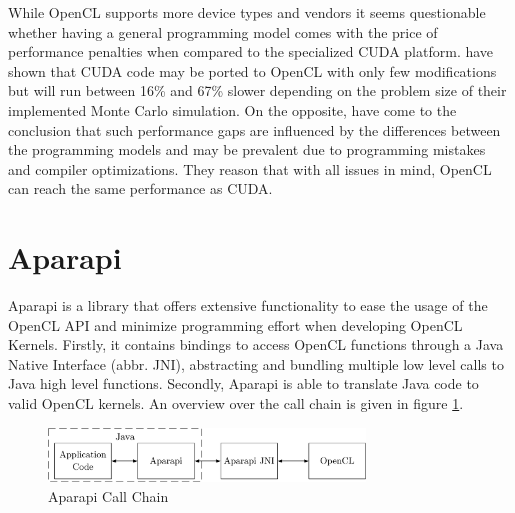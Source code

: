 While OpenCL supports more device types and vendors it seems questionable whether having a general programming model comes with the price of performance penalties when compared to the specialized CUDA platform. \citeauthor{performance_comparison} have shown that CUDA code may be ported to OpenCL with only few modifications but will run between 16\% and 67\% slower depending on the problem size of their implemented Monte Carlo simulation\cite{performance_comparison}. On the opposite, \citeauthor{comprehensive_performance_comparison} have come to the conclusion that such performance gaps are influenced by the differences between the programming models and may be prevalent due to programming mistakes and compiler optimizations\cite{comprehensive_performance_comparison}. They reason that with all issues in mind, OpenCL can reach the same performance as CUDA.

\section{Aparapi}
\label{aparapi}
Aparapi is a library that offers extensive functionality to ease the usage of the OpenCL API and minimize programming effort when developing OpenCL Kernels. Firstly, it contains bindings to access OpenCL functions through a Java Native Interface (abbr. JNI), abstracting and bundling multiple low level calls to Java high level functions. Secondly, Aparapi is able to translate Java code to valid OpenCL kernels. An overview over the call chain is given in figure \ref{img:aparapi_call_chain}.

\begin{figure}[!htb]	
	\includegraphics[width=0.75\textwidth]{drawings/aparapi_call_chain.pdf}
	\centering
	\caption{Aparapi Call Chain}
	\label{img:aparapi_call_chain}
\end{figure}

